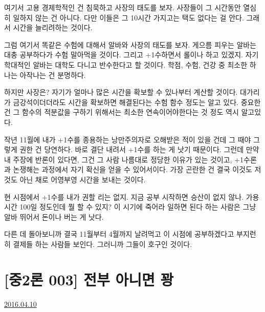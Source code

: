 여기서 고용 경제학적인 건 침묵하고 사장의 태도를 보자.
사장들이 그 시간동안 열심히 일하지 않는 건 아니다.
다만 이들은 그 10시간 가지고는 택도 없다는 걸 안다. 그래서 시간을 늘리려하는 것이다.
\vspace{5mm}

그럼 여기서 똑같은 수험에 대해서 알바와 사장의 태도를 보자.
게으름 피우는 알바는 대충 공부하다가 수험 말아먹을 것이다. 그리고 +1수하면서 롤이나 하고 있겠지.
자기학대적인 알바는 대학도 다니고 반수한다고 할 것이다. 학점, 수험, 건강 중 최소한 하나는 아작나는 건 분명하다.
\vspace{5mm}

하지만 사장은?
자기가 얼마나 많은 시간을 확보할 수 있나부터 계산할 것이다.
대가리가 금강석이더더라도 시간을 확보하면 해결된다는 수험 함수 정도는 알고 있다.
중요한 건 그 함수의 적분값을 구하기 위해서는 최소한 연속이어야한다는 것 정도 역시 알고있다.
\vspace{5mm}

작년 11월에 내가 +1수를 종용하는 낭만주의자로 오해받은 적이 있을 건데 그 때야 그렇게 권한 건 당연하다.
바로 결단 내려서 +1수를 하는 게 낫기 때문이다. 그런데 만약 내 주장에 반론이 있다면, 그건 그 사람 나름대로 정당한 이유가 있는 것이고,
+1수론과 논쟁해는 과정에서 자기 확신을 얻을 수 있어서이다.
가장 곤란한 건 결국 이것도 저것도 아닌 채로 어영부영 시간을 보내는 것이다.
\vspace{5mm}

현 시점에서 +1수를 내가 권할 리는 없지. 지금 공부 시작하면 승산이 없지 않나. 가용시간 100일 정도인데 뭘 할 수 있지?
이 시기에 죽어라 일하면 된다 하는 사람은 그냥 알바 뛰어서 돈이나 버는 게 낫다.
\vspace{5mm}

다른 데 돌아보니까 결국 11월부터 4월까지 날려먹고 이 시점에 공부하겠다고 부지런히 결제들 하는 사람들 보인다.
그러니까 그들이 호구인 것이다.
\vspace{5mm}





\section{[중2론 003] 전부 아니면 꽝}
\href{https://www.kockoc.com/Apoc/722596}{2016.04.10}


